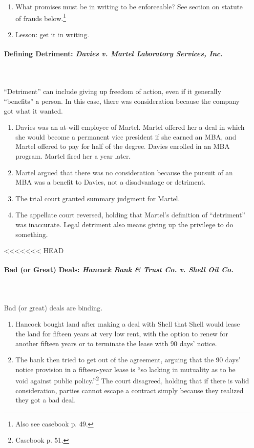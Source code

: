 \begin{enumerate}
    \item What promises must be in writing to be enforceable? See section on 
    statute of frauds below.\footnote{Also see casebook p. 49.}
    \item Lesson: get it in writing.
\end{enumerate}

\paragraph{Defining Detriment: \emph{Davies v. Martel Laboratory Services, 
Inc.}}
~\\\\
``Detriment'' can include giving up freedom of action, even if it generally 
``benefits'' a person. In this case, there was consideration because the 
company got what it wanted.

\begin{enumerate}
    \item Davies was an at-will employee of Martel. Martel offered her a 
    deal in which she would become a permanent vice president if she 
    earned an MBA, and Martel offered to pay for half of the degree. Davies 
    enrolled in an MBA program. Martel fired her a year later.
    \item Martel argued that there was no consideration because the pursuit of 
    an MBA was a benefit to Davies, not a disadvantage or detriment.
    \item The trial court granted summary judgment for Martel.
    \item The appellate court reversed, holding that Martel's definition of 
    ``detriment'' was inaccurate. Legal detriment also means giving up the 
    privilege to do something.
\end{enumerate}

<<<<<<< HEAD
\paragraph{Bad (or Great) Deals: \emph{Hancock Bank \& Trust Co. v. Shell Oil 
Co.}}
~\\\\
Bad (or great) deals are binding.

\begin{enumerate}
    \item Hancock bought land after making a deal with Shell that Shell would 
    lease the land for fifteen years at very low rent, with the option to 
    renew for another fifteen years or to terminate the lease with 90 days' 
    notice.
    \item The bank then tried to get out of the agreement, arguing that the 90 
    days' notice provision in a fifteen-year lease is ``so lacking in 
    mutuality as to be void against public policy.''\footnote{Casebook p. 51.} 
    The court disagreed, holding that if there is valid consideration, parties 
    cannot escape a contract simply because they realized they got a bad deal.
\end{enumerate}

